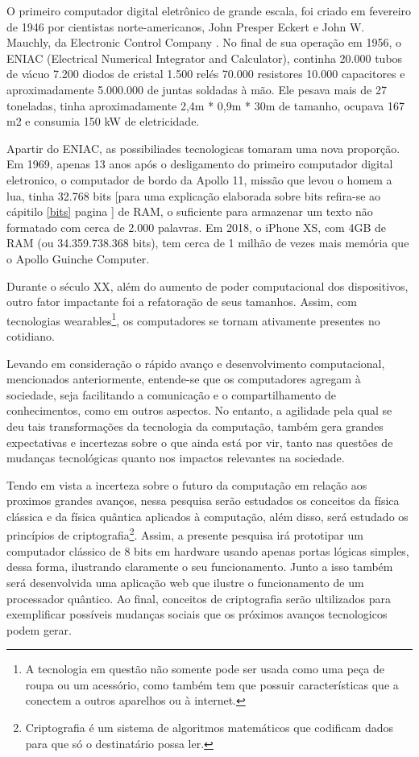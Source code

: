 O primeiro computador digital eletrônico de grande escala, foi criado em fevereiro de 1946 por cientistas norte-americanos, John Presper Eckert e John W. Mauchly, da Electronic Control Company . No final de sua operação em 1956, o ENIAC (Electrical Numerical Integrator and Calculator), continha 20.000 tubos de vácuo 7.200 diodos de cristal 1.500 relés 70.000 resistores 10.000 capacitores e aproximadamente 5.000.000 de juntas soldadas à mão. Ele pesava mais de 27 toneladas, tinha aproximadamente 2,4m * 0,9m * 30m de tamanho, ocupava 167 m2 e consumia 150 kW de eletricidade. \cite{2}

Apartir do ENIAC, as possibiliades tecnologicas tomaram uma nova proporção. Em 1969, apenas 13 anos após o desligamento do primeiro computador digital eletronico, o computador de bordo da Apollo 11, missão que levou o homem a lua, tinha 32.768 bits [para uma explicação elaborada sobre bits refira-se ao cápitilo \ref{bits} pagina \pageref{bits}] de RAM, o suficiente para armazenar um texto não formatado com cerca de 2.000 palavras. Em 2018, o iPhone XS, com 4GB de RAM (ou 34.359.738.368 bits), tem cerca de 1 milhão de vezes mais memória que o Apollo Guinche Computer. \cite{5}

Durante o século XX, além do aumento de poder computacional dos dispositivos, outro fator impactante foi a refatoração de seus tamanhos. Assim, com tecnologias wearables\footnote{A tecnologia em questão não somente pode ser usada como uma peça de roupa ou um acessório, como também tem que possuir características que a conectem a outros aparelhos ou à internet.}, os computadores se tornam ativamente presentes no cotidiano.

Levando em consideração o rápido avanço e desenvolvimento computacional, mencionados anteriormente, entende-se que os computadores agregam à sociedade, seja facilitando a comunicação e o compartilhamento de conhecimentos, como em outros aspectos. No entanto, a agilidade pela qual se deu tais transformações da tecnologia da computação, também gera grandes expectativas e incertezas sobre o que ainda está por vir, tanto nas questões de mudanças tecnológicas quanto nos impactos relevantes na sociedade.

Tendo em vista a incerteza sobre o futuro da computação em relação aos proximos grandes avanços, nessa pesquisa serão estudados os conceitos da física clássica e da física quântica aplicados à computação, além disso, será estudado os princípios de criptografia\footnote{Criptografia é um sistema de algoritmos matemáticos que codificam dados para que só o destinatário possa ler.}. Assim, a presente pesquisa irá prototipar um computador clássico de 8 bits em hardware usando apenas portas lógicas simples, dessa forma, ilustrando claramente o seu funcionamento. Junto a isso também será desenvolvida uma aplicação web que ilustre o funcionamento de um processador quântico. Ao final, conceitos de criptografia serão ultilizados para exemplificar possíveis mudanças sociais que os próximos avanços tecnologicos podem gerar.

